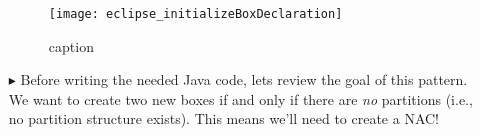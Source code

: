 \begin{itemize}
\begin{figure}[htp]
\begin{center}
  \texttt{[image: eclipse\_initializeBoxDeclaration]}
  \caption{caption}
  \label{fig:initBoxDecl}
\end{center}
\end{figure}

\item[$\blacktriangleright$] Before writing the needed Java code, lets review the goal of this pattern. We want to create two new boxes if and only if there are
\emph{no} partitions (i.e., no partition structure exists). This means we'll need to create a NAC!
 

\end{itemize}
